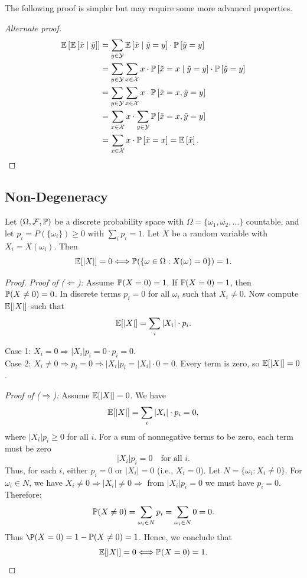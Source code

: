 The following proof is simpler but may require some more advanced properties.
\begin{proof}[Alternate proof]
\begin{align*}
\mathbb{E}\left[\mathbb{E}\left[\tilde{x} \mid  \tilde{y}\right] \right]
&= \sum_{y\in \mathcal{Y}} \mathbb{E}\left[\tilde{x} \mid \tilde{y} = y \right] \cdot \mathbb{P}\left[ \tilde{y} = y \right]  \\
&= \sum_{y\in \mathcal{Y}} \sum_{x\in \mathcal{X}} x \cdot \mathbb{P}\left[\tilde{x} = x \mid \tilde{y} = y \right] \cdot \mathbb{P}\left[ \tilde{y} = y \right]  \\
&= \sum_{y\in \mathcal{Y}} \sum_{x\in \mathcal{X}} x \cdot  \mathbb{P}\left[\tilde{x} = x, \tilde{y} = y \right]   \\
&=  \sum_{x\in \mathcal{X}} x \cdot \sum_{y\in \mathcal{Y}} \mathbb{P}\left[\tilde{x} = x, \tilde{y} = y \right]   \\
&=  \sum_{x\in \mathcal{X}} x \cdot  \mathbb{P}\left[\tilde{x} = x \right]  = \mathbb{E} \left[ \tilde{x} \right].
\end{align*}
\end{proof}


\subsection{Non-Degeneracy}
\begin{theorem} \label{thm:non-degeneracy}
Let $(\Omega,\mathcal{F},\mathbb{P})$ be a discrete probability space with $\Omega=\{\omega_1,\omega_2,\ldots\}$ countable, and let $p_i=P(\{\omega_i\})\geq0$ with $\sum_i p_i =1$. Let $X$ be a random variable with $X_i=X(\omega_i)$. Then
\[
\mathbb{E}[|X|]=0 \Longleftrightarrow \mathbb{P}(\{\omega\in\Omega:X(\omega)=0\})=1.
\]
\end{theorem}

\begin{proof}
\textit{Proof of ($\Leftarrow$):} Assume $\mathbb{P}(X=0)=1$.
If $\mathbb{P}(X=0)=1$, then $\mathbb{P}(X\neq0)=0$.
In discrete terms $p_i=0$ for all $\omega_i$ such that $X_i\neq0$.
Now compute $\mathbb{E}[|X|]$ such that
\[
\mathbb{E}[|X|]=\sum_i |X_i| \cdot p_i.
\]

	Case 1: $X_i=0\Rightarrow |X_i|p_i=0\cdot p_i=0$.\\
	Case 2: $X_i\neq0\Rightarrow p_i=0\Rightarrow |X_i|p_i=|X_i|\cdot0=0$.
Every term is zero, so $\mathbb{E}[|X|]=0$.

\textit{Proof of ($\Rightarrow$):} Assume $\mathbb{E}[|X|]=0$.
We have
\[
\mathbb{E}[|X|]=\sum_i |X_i| \cdot p_i=0,
\]
where $|X_i|p_i\geq0$ for all $i$. For a sum of nonnegative terms to be zero, each term must be zero
\[
|X_i|p_i=0 \quad \text{for all } i.
\]
Thus, for each $i$, either $p_i=0$ or $|X_i|=0$ (i.e., $X_i=0$).
Let $N=\{\omega_i:X_i\neq0\}$.
For $\omega_i\in N$, we have $X_i\neq0\Rightarrow |X_i|\neq0\Rightarrow$ from $|X_i|p_i=0$ we must have $p_i=0$.
Therefore:
\[
\mathbb{P}(X\neq0)=\sum_{\omega_i\in N} p_i =\sum_{\omega_i\in N} 0=0.
\]
Thus $\P(X=0)=1-\PP(X\neq0)=1$. Hence, we conclude that 
\[
\mathbb{E}[|X|]=0 \Longleftrightarrow \mathbb{P}(X=0)=1.
\]
\end{proof}


